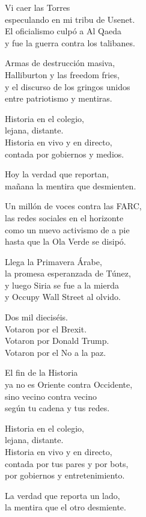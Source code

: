 \begin{lyrics}
Vi caer las Torres\\
especulando en mi tribu de Usenet.\\
El oficialismo culpó a Al Qaeda\\
y fue la guerra contra los talibanes.

Armas de destrucción masiva,\\
Halliburton y las freedom fries,\\
y el discurso de los gringos unidos\\
entre patriotismo y mentiras.

Historia en el colegio,\\
lejana, distante.\\
Historia en vivo y en directo,\\
contada por gobiernos y medios.

Hoy la verdad que reportan,\\
mañana la mentira que desmienten.

Un millón de voces contra las FARC,\\
las redes sociales en el horizonte\\
como un nuevo activismo de a pie\\
hasta que la Ola Verde se disipó.

Llega la Primavera Árabe,\\
la promesa esperanzada de Túnez,\\
y luego Siria se fue a la mierda\\
y Occupy Wall Street al olvido.

Dos mil dieciséis.\\
Votaron por el Brexit.\\
Votaron por Donald Trump.\\
Votaron por el No a la paz.

El fin de la Historia\\
ya no es Oriente contra Occidente,\\
sino vecino contra vecino\\
según tu cadena y tus redes.

Historia en el colegio,\\
lejana, distante.\\
Historia en vivo y en directo,\\
contada por tus pares y por bots,\\
por gobiernos y entretenimiento.

La verdad que reporta un lado,\\
la mentira que el otro desmiente.
\end{lyrics}

